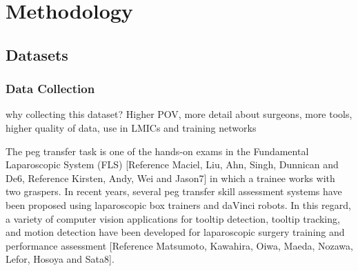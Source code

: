 \section{Methodology}


\subsection{Datasets}


\subsubsection{Data Collection}

why collecting this dataset?
Higher POV, more detail about surgeons, more tools, higher quality of data, use in LMICs and training networks

The peg transfer task is one of the hands-on exams in the Fundamental Laparoscopic System (FLS) [Reference Maciel, Liu, Ahn, Singh, Dunnican and De6, Reference Kirsten, Andy, Wei and Jason7] in which a trainee works with two graspers. In recent years, several peg transfer skill assessment systems have been proposed using laparoscopic box trainers and daVinci robots. In this regard, a variety of computer vision applications for tooltip detection, tooltip tracking, and motion detection have been developed for laparoscopic surgery training and performance assessment [Reference Matsumoto, Kawahira, Oiwa, Maeda, Nozawa, Lefor, Hosoya and Sata8]. 

